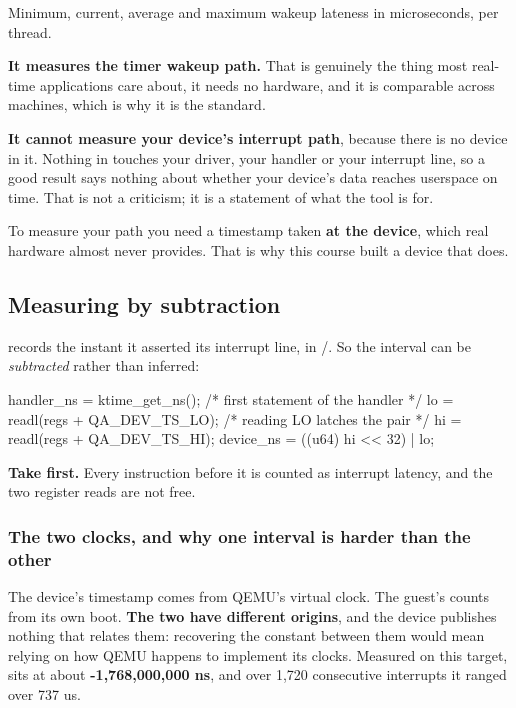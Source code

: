 \noindent Minimum, current, average and maximum wakeup lateness in microseconds, per thread.

\textbf{It measures the timer wakeup path.} That is genuinely the thing most real-time applications
care about, it needs no hardware, and it is comparable across machines, which is why it is the
standard.

\textbf{It cannot measure your device's interrupt path}, because there is no device in it. Nothing
in  touches your driver, your handler or your interrupt line, so a good
 result says nothing about whether your device's data reaches userspace on time.
That is not a criticism; it is a statement of what the tool is for.

To measure your path you need a timestamp taken \textbf{at the device}, which real hardware almost
never provides. That is why this course built a device that does.

\subsection{Measuring by subtraction}
\label{c12:app:b3}

 records the instant it asserted its interrupt line, in /. So
the interval can be \emph{subtracted} rather than inferred:

\begin{ccode}
handler_ns = ktime_get_ns();                      /* first statement of the handler */
lo = readl(regs + QA_DEV_TS_LO);                  /* reading LO latches the pair */
hi = readl(regs + QA_DEV_TS_HI);
device_ns = ((u64) hi << 32) | lo;
\end{ccode}

\noindent \textbf{Take  first.} Every instruction before it is counted as
interrupt latency, and the two register reads are not free.

\subsubsection{The two clocks, and why one interval is harder than the other}
\label{c12:app:b:the-two-clocks-and-why-one-interval-is-harder-than-the-other}

The device's timestamp comes from QEMU's virtual clock. The guest's  counts
from its own boot. \textbf{The two have different origins}, and the device publishes nothing that
relates them: recovering the constant between them would mean relying on how QEMU happens to
implement its clocks. Measured on this target,  sits at about
\textbf{-1,768,000,000 ns}, and over 1,720 consecutive interrupts it ranged over 737 us.

